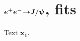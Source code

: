 \documentclass{article}
\newcommand{\ee}{e^+ e^-}
\begin{document}
\section{$\boldsymbol{\ee$$\rightarrow$$J/\psi}$, fits}
Text $\bm{x_1}$.
\end{document}
